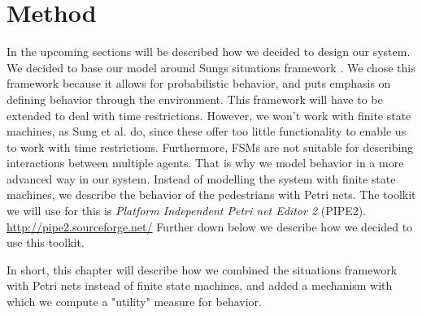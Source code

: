\documentclass[11pt, a4paper]{book}
\begin{document}
\chapter{Method}
In the upcoming sections will be described how we decided to design our system. We decided to base our model around Sungs situations framework \cite{Sung04scalablebehaviors}. We chose this framework because it allows for probabilistic behavior, and puts emphasis on defining behavior through the environment. This framework will have to be extended to deal with time restrictions. However, we won't work with finite state machines, as Sung et al. do, since these offer too little functionality to enable us to work with time restrictions. Furthermore, FSMs are not suitable for describing interactions between multiple agents. That is why we model behavior in a more advanced way in our system. Instead of modelling the system with finite state machines, we describe the behavior of the pedestrians with Petri nets.  The toolkit we will use for this is \emph{Platform Independent Petri net Editor 2} (PIPE2). \url{http://pipe2.sourceforge.net/} Further down below we describe how we decided to use this toolkit.

In short, this chapter will describe how we combined the situations framework with Petri nets instead of finite state machines, and added a mechanism with which we compute a "utility" measure for behavior.
\end{document}
